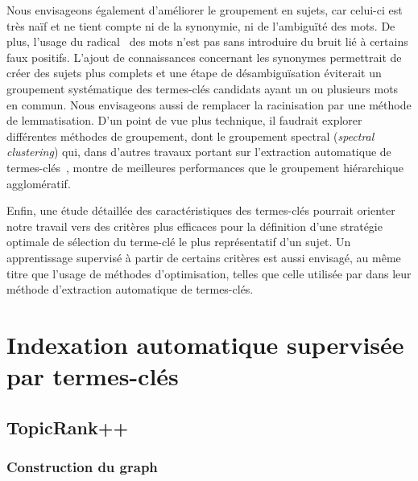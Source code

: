         Nous envisageons également d'améliorer le groupement en sujets, car
        celui-ci est très naïf et ne tient compte ni de la synonymie, ni de
        l'ambiguïté des mots. De plus, l'usage du
        radical~\cite{porter1980suffixstripping} des mots n'est pas sans
        introduire du bruit lié à certains faux positifs. L'ajout de
        connaissances concernant les synonymes permettrait de créer des sujets
        plus complets et une étape de désambiguïsation éviterait un groupement
        systématique des termes-clés candidats ayant un ou plusieurs mots en
        commun. Nous envisageons aussi de remplacer la racinisation par une
        méthode de lemmatisation. D'un point de vue plus technique, il faudrait
        explorer différentes méthodes de groupement, dont le groupement spectral
        (\textit{spectral clustering}) qui, dans d'autres travaux portant sur
        l'extraction automatique de termes-clés~\cite{liu2009keycluster}, montre
        de meilleures performances que le groupement hiérarchique agglomératif.

        Enfin, une étude détaillée des caractéristiques des termes-clés pourrait
        orienter notre travail vers des critères plus efficaces pour la
        définition d'une stratégie \og{}optimale\fg{} de sélection du terme-clé
        le plus représentatif d'un sujet. Un apprentissage supervisé à partir de
        certains critères est aussi envisagé, au même titre que l'usage de
        méthodes d'optimisation, telles que celle utilisée par
         dans leur méthode
        d'extraction automatique de termes-clés.


  \section{Indexation automatique supervisée par termes-clés}
  \label{sec:main-automatic_keyphrase_annotation-supervised_automatic_keyphrase_extraction}

    \subsection{TopicRank++}
    \label{subsec:main-automatic_keyphrase_annotation-supervised_automatic_keyphrase_annotation-topicrank++}
      \subsubsection{Construction du graph}
      \label{subsubsec:main-automatic_keyphrase_annotation-supervised_automatic_keyphrase_extraction-topicrank++-graph_construction}

